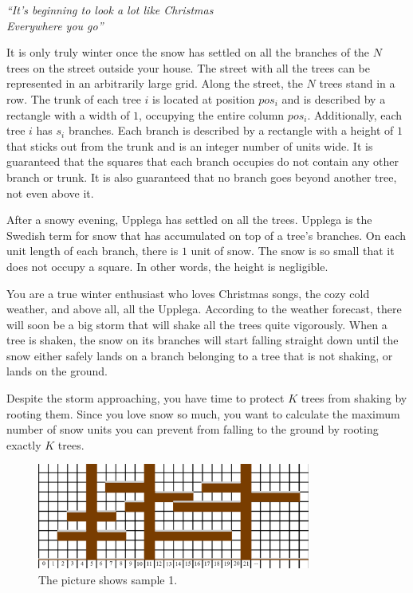 
\begin{center}
  \textit{``It's beginning to look a lot like Christmas\\ Everywhere you go''}
\end{center}
  
\noindent
It is only truly winter once the snow has settled on all the branches of the $N$ trees on the street outside your house.
The street with all the trees can be represented in an arbitrarily large grid. Along the street, the $N$ trees stand in a row.
The trunk of each tree $i$ is located at position $pos_i$ and is described by a rectangle with a width of $1$, occupying the
entire column $pos_i$. Additionally, each tree $i$ has $s_i$ branches. Each branch is described by a rectangle with a height of $1$ 
that sticks out from the trunk and is an integer number of units wide.
It is guaranteed that the squares that each branch occupies do not contain any other branch or trunk. It is also guaranteed that
no branch goes beyond another tree, not even above it.

After a snowy evening, Upplega has settled on all the trees.
Upplega is the Swedish term for snow that has accumulated on top of a tree's branches.
On each unit length of each branch, there is $1$ unit of snow. The snow is so small that it does not occupy a square. In other words, 
the height is negligible. 

You are a true winter enthusiast who loves Christmas songs, the cozy cold weather, and above all, all the Upplega.
According to the weather forecast, there will soon be a big storm that will shake all the trees quite vigorously.
When a tree is shaken, the snow on its branches will start falling straight down until the snow either safely lands
on a branch belonging to a tree that is not shaking, or lands on the ground.

Despite the storm approaching, you have time to protect $K$ trees from shaking by rooting them.
Since you love snow so much, you want to calculate the maximum number of snow units you can prevent from falling
to the ground by rooting exactly $K$ trees.

\begin{centering}
  \begin{figure}[h]
      \centering
      \includegraphics[width=0.8\textwidth]{sample1.png}
      \caption{The picture shows sample 1.}
  \end{figure}
\end{centering}

